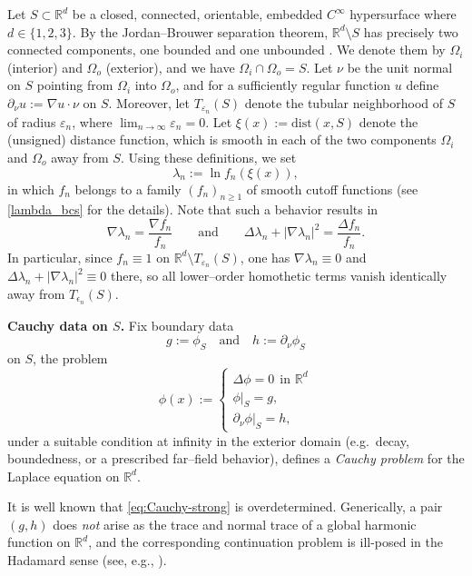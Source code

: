 \documentclass[preprint,12pt]{elsarticle}
\theoremstyle{plain}
\theoremstyle{definition}
\theoremstyle{note}
\newcommand{\R}{\mathbb{R}}
\begin{document}
Let $S\subset \R^d$ be a closed, connected, orientable, embedded $C^\infty$ hypersurface where $d\in\{1,2,3\}$. By the Jordan--Brouwer separation theorem, $\R^d\setminus S$ has precisely two connected components, one bounded and one unbounded \cite{Munkres2000}. We denote them by $\Omega_i$ (interior) and $\Omega_o$ (exterior), and we have ${\Omega}_i\cap {\Omega}_o=S$. Let $\nu$ be the unit normal on $S$ pointing from $\Omega_i$ into $\Omega_o$, and for a sufficiently regular function $u$ define $\partial_\nu u := \nabla u\cdot \nu$ on $S$. Moreover, let $T_{\varepsilon_n}(S)$ denote the tubular neighborhood of $S$ of radius $\varepsilon_n$, where $\lim_{n\to\infty} \varepsilon_n=0$. Let $\xi(x):=\mathrm{dist}(x,S)$ denote the (unsigned) distance function, which is smooth in each of the two components $\Omega_i$ and $\Omega_o$ away from $S$. Using these definitions, we set
\begin{equation}\label{eq:lambda-n}
\lambda_n := \ln f_n(\xi(x)),
\end{equation}
in which $f_n$ belongs to a family $(f_n)_{n\ge 1}$ of smooth cutoff functions (see \ref{lambda_bcs} for the details). Note that such a behavior results in
\begin{equation}\label{eq:pen_11}
\nabla\lambda_n=\frac{\nabla f_n}{f_n}\qquad\text{and}\qquad \Delta\lambda_n+|\nabla\lambda_n|^2=\frac{\Delta f_n}{f_n}.
\end{equation}
In particular, since $f_n\equiv 1$ on $\R^d\setminus T_{\varepsilon_n}(S)$, one has $\nabla\lambda_n\equiv 0$ and $\Delta\lambda_n+|\nabla\lambda_n|^2\equiv 0$ there, so all lower--order homothetic terms vanish identically away from $T_{\epsilon_n}(S)$.

\medskip
\noindent\textbf{Cauchy data on $S$.} Fix boundary data
\[
g := \phi_S \quad\text{and}\quad h := \partial_\nu \phi_S
\]
on $S$, the problem 
\begin{equation}\label{eq:Cauchy-strong}
\phi(x):=\begin{cases}
\Delta \phi = 0 \ \ \text{in }\R^d \\
\phi|_{S}=g, \\
\partial_\nu\phi|_{S}=h,
\end{cases}
\end{equation}
under a suitable condition at infinity in the exterior domain (e.g.\ decay, boundedness, or a prescribed far--field behavior), defines a \emph{Cauchy problem} for the Laplace equation on $\R^d$. 

It is well known that \eqref{eq:Cauchy-strong} is overdetermined. Generically, a pair $(g,h)$ does \emph{not} arise as the trace and normal trace of a global harmonic function on $\R^d$, and the corresponding continuation problem is ill-posed in the Hadamard sense (see, e.g., \cite{Hadamard1923,LionsMagenes1972}).
\end{document}
